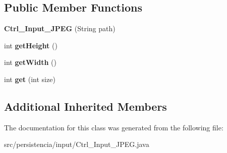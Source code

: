 \subsection*{Public Member Functions}
\begin{DoxyCompactItemize}
\item 
\mbox{\label{classpersistencia_1_1input_1_1Ctrl__Input__JPEG_aa7d81dfa6240a7ee82e5188fc2600c58}} 
{\bfseries Ctrl\+\_\+\+Input\+\_\+\+J\+P\+EG} (String path)
\item 
\mbox{\label{classpersistencia_1_1input_1_1Ctrl__Input__JPEG_a16212709871daadfd0ddf345f84627af}} 
int {\bfseries get\+Height} ()
\item 
\mbox{\label{classpersistencia_1_1input_1_1Ctrl__Input__JPEG_ad9b46004c4c9a2b425fbc84fe1207aea}} 
int {\bfseries get\+Width} ()
\item 
\mbox{\label{classpersistencia_1_1input_1_1Ctrl__Input__JPEG_a3894c1b536caad56b58e993ad5db6b11}} 
int {\bfseries get} (int size)
\end{DoxyCompactItemize}
\subsection*{Additional Inherited Members}


The documentation for this class was generated from the following file\+:\begin{DoxyCompactItemize}
\item 
src/persistencia/input/Ctrl\+\_\+\+Input\+\_\+\+J\+P\+E\+G.\+java\end{DoxyCompactItemize}
